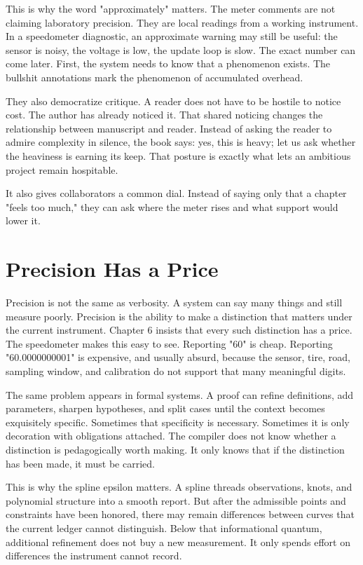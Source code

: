 This is why the word "approximately" matters. The meter comments are not
claiming laboratory precision. They are local readings from a working
instrument. In a speedometer diagnostic, an approximate warning may still be
useful: the sensor is noisy, the voltage is low, the update loop is slow. The
exact number can come later. First, the system needs to know that a phenomenon
exists. The bullshit annotations mark the phenomenon of accumulated overhead.

They also democratize critique. A reader does not have to be hostile to notice
cost. The author has already noticed it. That shared noticing changes the
relationship between manuscript and reader. Instead of asking the reader to
admire complexity in silence, the book says: yes, this is heavy; let us ask
whether the heaviness is earning its keep. That posture is exactly what lets an
ambitious project remain hospitable.

It also gives collaborators a common dial. Instead of saying only that a
chapter "feels too much," they can ask where the meter rises and what support
would lower it.

\section{Precision Has a Price}
\label{se:precision-has-a-price}

Precision is not the same as verbosity. A system can say many things and still
measure poorly. Precision is the ability to make a distinction that matters
under the current instrument. Chapter 6 insists that every such distinction has
a price. The speedometer makes this easy to see. Reporting "60" is cheap.
Reporting "60.0000000001" is expensive, and usually absurd, because the sensor,
tire, road, sampling window, and calibration do not support that many
meaningful digits.

The same problem appears in formal systems. A proof can refine definitions,
add parameters, sharpen hypotheses, and split cases until the context becomes
exquisitely specific. Sometimes that specificity is necessary. Sometimes it is
only decoration with obligations attached. The compiler does not know whether a
distinction is pedagogically worth making. It only knows that if the
distinction has been made, it must be carried.

This is why the spline epsilon matters. A spline threads observations, knots,
and polynomial structure into a smooth report. But after the admissible points
and constraints have been honored, there may remain differences between curves
that the current ledger cannot distinguish. Below that informational quantum,
additional refinement does not buy a new measurement. It only spends effort
on differences the instrument cannot record.

